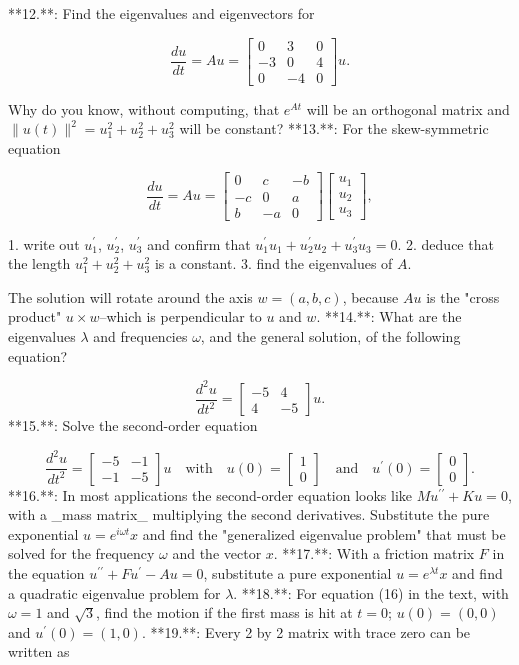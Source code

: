 

**12.**: Find the eigenvalues and eigenvectors for

\[\frac{du}{dt}=Au=\begin{bmatrix}0&3&0\\ -3&0&4\\ 0&-4&0\end{bmatrix}u.\]

Why do you know, without computing, that \(e^{At}\) will be an orthogonal matrix and \(\|u(t)\|^{2}=u_{1}^{2}+u_{2}^{2}+u_{3}^{2}\) will be constant?
**13.**: For the skew-symmetric equation

\[\frac{du}{dt}=Au=\begin{bmatrix}0&c&-b\\ -c&0&a\\ b&-a&0\end{bmatrix}\begin{bmatrix}u_{1}\\ u_{2}\\ u_{3}\end{bmatrix},\]

1. write out \(u_{1}^{\prime}\), \(u_{2}^{\prime}\), \(u_{3}^{\prime}\) and confirm that \(u_{1}^{\prime}u_{1}+u_{2}^{\prime}u_{2}+u_{3}^{\prime}u_{3}=0\).
2. deduce that the length \(u_{1}^{2}+u_{2}^{2}+u_{3}^{2}\) is a constant.
3. find the eigenvalues of \(A\).

The solution will rotate around the axis \(w=(a,b,c)\), because \(Au\) is the "cross product" \(u\times w\)--which is perpendicular to \(u\) and \(w\).
**14.**: What are the eigenvalues \(\lambda\) and frequencies \(\omega\), and the general solution, of the following equation?

\[\frac{d^{2}u}{dt^{2}}=\begin{bmatrix}-5&4\\ 4&-5\end{bmatrix}u.\]
**15.**: Solve the second-order equation

\[\frac{d^{2}u}{dt^{2}}=\begin{bmatrix}-5&-1\\ -1&-5\end{bmatrix}u\quad\text{with}\quad u(0)=\begin{bmatrix}1\\ 0\end{bmatrix}\quad\text{and}\quad u^{\prime}(0)=\begin{bmatrix}0\\ 0\end{bmatrix}.\]
**16.**: In most applications the second-order equation looks like \(Mu^{\prime\prime}+Ku=0\), with a _mass matrix_ multiplying the second derivatives. Substitute the pure exponential \(u=e^{i\omega t}x\) and find the "generalized eigenvalue problem" that must be solved for the frequency \(\omega\) and the vector \(x\).
**17.**: With a friction matrix \(F\) in the equation \(u^{\prime\prime}+Fu^{\prime}-Au=0\), substitute a pure exponential \(u=e^{\lambda t}x\) and find a quadratic eigenvalue problem for \(\lambda\).
**18.**: For equation (16) in the text, with \(\omega=1\) and \(\sqrt{3}\), find the motion if the first mass is hit at \(t=0\); \(u(0)=(0,0)\) and \(u^{\prime}(0)=(1,0)\).
**19.**: Every 2 by 2 matrix with trace zero can be written as

